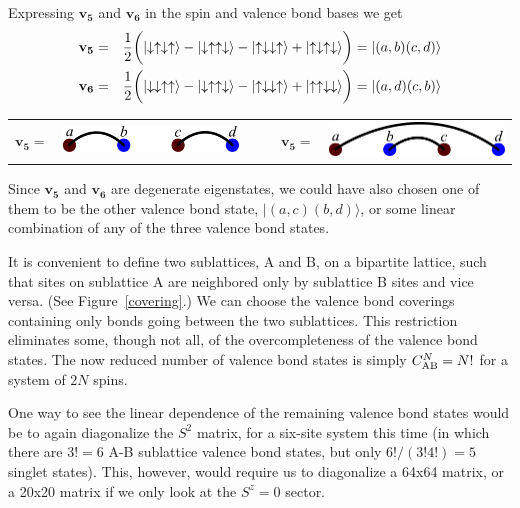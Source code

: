 Expressing $\mathbf{v_5}$ and $\mathbf{v_6}$ in the spin and valence bond bases we get
\begin{eqnarray}
\mathbf{v_5} &=&\frac{1}{2}\bigg(\lvert \downarrow \uparrow \downarrow \uparrow \rangle - \lvert \downarrow \uparrow \uparrow \downarrow \rangle
			- \lvert \uparrow \downarrow \downarrow \uparrow \rangle + \lvert \uparrow \downarrow \uparrow \downarrow \rangle \bigg) 
			= \lvert(a,b)(c,d)\rangle \label{state5}\\
\mathbf{v_6} &=&\frac{1}{2}\bigg(\lvert \downarrow \downarrow \uparrow \uparrow \rangle - \lvert \downarrow \uparrow \uparrow \downarrow \rangle
			- \lvert \uparrow \downarrow \downarrow \uparrow \rangle + \lvert \uparrow \uparrow \downarrow \downarrow \rangle \bigg)
			= \lvert(a,d)(c,b)\rangle \label{state6}
\end{eqnarray}
\begin{center}
\begin{tabular}{ccccc}
$\mathbf{v_5} =$ &  \includegraphics [width=2in]{./figures/made/state5.pdf} &\;\;\;\;\;\;\,\,\,\,\,\,
& $\mathbf{v_5} =$ &  \includegraphics [width=2in]{./figures/made/state6.pdf} 
\end{tabular}
\end{center}
Since $\mathbf{v_5}$ and  $\mathbf{v_6}$ are degenerate eigenstates, we could have also chosen one of them to be the other valence bond state, $\lvert(a,c)(b,d)\rangle$, or some linear combination of any of the three valence bond states.

It is convenient to define two sublattices, A and B, on a bipartite lattice, such that sites on 
sublattice A are neighbored only by sublattice B sites and vice versa. (See Figure~\ref{covering}.)
We can choose the valence bond coverings containing only bonds going between the two sublattices.
This restriction eliminates some, though not all, of the overcompleteness of the valence bond states.
The now reduced number of valence bond states is simply $C_{\rm{AB}}^N = N!$ for a system of $2N$ spins.

One way to see the linear dependence of the remaining valence bond states would be to again diagonalize
the $S^2$ matrix, for a six-site system this time (in which there are $3!=6$ A-B sublattice
valence bond states, but only $6!/(3!4!) = 5$ singlet states).
This, however, would require us to diagonalize a 64x64 matrix, or a 20x20 matrix if we only look at
the $S^z=0$ sector.

